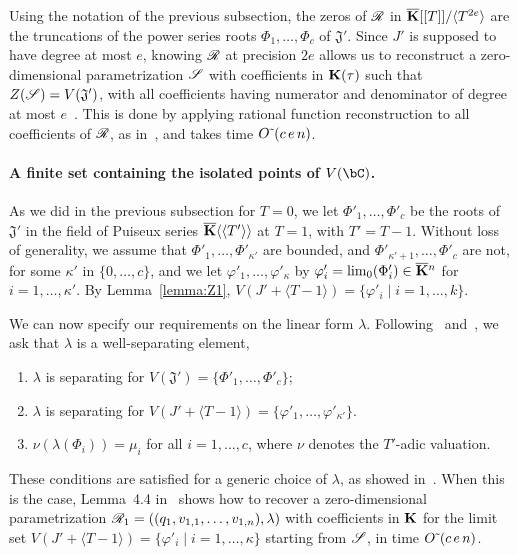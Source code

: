 \documentclass[12pt]{article}
\begin{document}
Using the notation of the previous subsection, the zeros of $\mathscr{R}$ in
$\overline{\mathbf{K}}[[T]]/\langle T^{2e}\rangle$ are the truncations of the power
series roots $\Phi_1,\dots,\Phi_c$ of $\mathfrak{J}'$. Since $J'$ is
supposed to have degree at most $e$, knowing $\mathscr{R}$ at precision $2e$
allows us to reconstruct a zero-dimensional parametrization $\mathscr{S}$
with coefficients in $\mathbf{K}(\tau)$ such that
$Z(\mathscr{S})=V(\mathfrak{J}')$, with all coefficients having numerator
and denominator of degree at most $e$~\cite[Theorem~1]{Schost03}.
This is done by applying rational function reconstruction to all
coefficients of $\mathscr{R}$, as in~\cite{Schost03}, and takes time
${O}{\,\tilde{ }\,}(c\,e\,n)$.


\paragraph{A finite set containing the isolated points of $V(\bC)$.}
As we did in the previous subsection for $T=0$, we let
$\Phi'_1,\dots,\Phi'_c$ be the roots of $\mathfrak{J}'$ in the field
of Puiseux series $\overline{\mathbf{K}}\langle\langle T'\rangle\rangle$ at $T=1$,
with $T'=T-1$. Without loss of generality, we assume that
$\Phi'_1,\dots,\Phi'_{\kappa'}$ are bounded, and
$\Phi'_{\kappa'+1},\dots,\Phi'_c$ are not, for some $\kappa'$ in
$\{0,\dots,c\}$, and we let $\varphi'_1,\dots,\varphi'_\kappa$ by
$\varphi'_i=\lim_0(\Phi'_i)\in\overline{\mathbf{K}}{}^n$ for $i=1,\dots,\kappa'$.  By
Lemma~\ref{lemma:Z1},
$V(J' + \langle T-1\rangle) = \{ \varphi'_i \mid i=1,\dots,k\}$.

We can now specify our requirements on the linear form $\lambda$.
Following~\cite{RRS} and~\cite{SaSc16}, we ask that $\lambda$ is a
{\rm well-separating element},
\begin{enumerate}
\item $\lambda$ is separating for $V(\mathfrak{J}')=\{\Phi'_1,\dots,\Phi'_c\}$;
\item $\lambda$ is separating for $V(J' + \langle T-1\rangle) = \{ \varphi'_1,\dots,\varphi'_{\kappa'}\}$.
\item $\nu(\lambda(\Phi_i)) = \mu_i$ for all $i=1,\dots,c$, where $\nu$ denotes
 the $T'$-adic valuation.
\end{enumerate}
These conditions are satisfied for a generic choice of $\lambda$, as
showed in~\cite{SaSc16}. When this is the case, Lemma~4.4
in~\cite{RRS} shows how to recover a zero-dimensional parametrization
$\mathscr{R}_1=((q_1,v_{1,1},\dots,v_{1,n}),\lambda)$ with coefficients in
$\mathbf{K}$ for the limit set $V(J' + \langle T-1\rangle) =\{\varphi'_i \mid i=1,\dots,\kappa\}$
starting from $\mathscr{S}$, in time 
${O}{\,\tilde{ }\,}(c\,e\,n)$.
\end{document}
